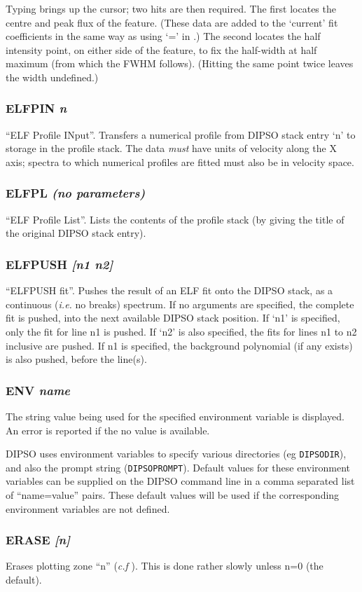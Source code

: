\documentclass[twoside,11pt,noabs,nolof]{starlink}
\providecommand{\dipcom}[3]{\subsubsection*{\label{COM:#1}\textbf{#1} \emph{#2}}}
\begin{document}
Typing   brings up the cursor; two hits are then required. The
first locates the centre and peak flux of the feature. (These data are
added to the `current' fit coefficients in the same way as using `='
in .)  The second locates the half intensity point, on either
side of the feature, to fix the half-width at half maximum (from which
the FWHM follows). (Hitting the same point twice leaves the width
undefined.)

\dipcom{ELFPIN}{n}{Moves data from the DIPSO stack to the ELF profile stack}
``ELF Profile INput''. Transfers a numerical profile from DIPSO stack
entry `n' to storage in the profile stack. The data \emph{must} have
units of velocity along the X axis; spectra to which numerical
profiles are fitted must also be in velocity space.

\dipcom{ELFPL}{(no parameters)}{Lists the contents of the ELF profile stack}
``ELF Profile List''. Lists the contents of the profile stack (by
giving the title of the original DIPSO stack entry).

\dipcom{ELFPUSH}{[n1 n2]}{Pushes a data array representing an ELF fit onto the DIPSO stack}
``ELFPUSH fit''. Pushes the result of an ELF fit onto the DIPSO
stack, as a continuous (\emph{i.e.} no breaks) spectrum. If no
arguments are specified, the complete fit is pushed, into the next
available DIPSO stack position. If `n1' is specified, only the fit for
line n1 is pushed. If `n2' is also specified, the fits for lines n1 to
n2 inclusive are pushed. If n1 is specified, the background polynomial
(if any exists) is also pushed, before the line(s).

\dipcom{ENV}{name}{Displays the value being used by DIPSO for a specified
environment variable}
The string value being used for the specified environment variable is
displayed. An error is reported if the no value is available.

DIPSO uses environment variables to specify various directories (eg
\verb+DIPSODIR+), and also the prompt string (\verb+DIPSOPROMPT+).
Default values for these environment variables can be supplied
on the DIPSO command line in a comma separated list of ``name=value''
pairs. These default values will be used if the corresponding environment
variables are not defined.

\dipcom{ERASE}{[n]}{Erases a plotting zone created by {\texttt{TZONE}}}
Erases plotting zone ``n'' (\textit{c.f} ).  This is done rather slowly
unless n=0 (the default).
\end{document}
